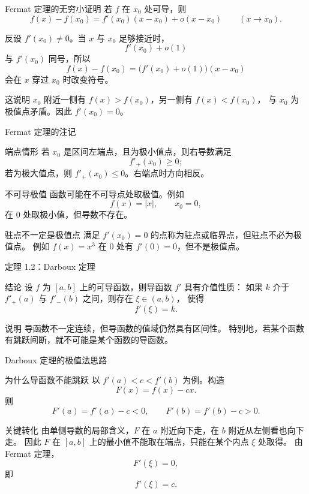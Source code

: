 \documentclass[aspectratio=169,10pt]{ctexbeamer}
\begin{document}
\begin{frame}{Fermat 定理的无穷小证明}
\small
若 $f$ 在 $x_0$ 处可导，则
\[
  f(x)-f(x_0)=f'(x_0)(x-x_0)+o(x-x_0)\qquad (x\to x_0).
\]

反设 $f'(x_0)\ne0$。当 $x$ 与 $x_0$ 足够接近时，
\[
  f'(x_0)+o(1)
\]
与 $f'(x_0)$ 同号，所以
\[
  f(x)-f(x_0)=\bigl(f'(x_0)+o(1)\bigr)(x-x_0)
\]
会在 $x$ 穿过 $x_0$ 时改变符号。

这说明 $x_0$ 附近一侧有 $f(x)>f(x_0)$，另一侧有 $f(x)<f(x_0)$，
与 $x_0$ 为极值点矛盾。因此 $f'(x_0)=0$。
\end{frame}

\begin{frame}{Fermat 定理的注记}
\footnotesize
\begin{block}{端点情形}
若 $x_0$ 是区间左端点，且为极小值点，则右导数满足
\[
  f'_+(x_0)\ge0;
\]
若为极大值点，则 $f'_+(x_0)\le0$。右端点时方向相反。
\end{block}
\begin{block}{不可导极值}
函数可能在不可导点处取极值。例如
\[
  f(x)=|x|,\qquad x_0=0,
\]
在 $0$ 处取极小值，但导数不存在。
\end{block}
\begin{alertblock}{驻点不一定是极值点}
满足 $f'(x_0)=0$ 的点称为驻点或临界点，但驻点不必为极值点。
例如 $f(x)=x^3$ 在 $0$ 处有 $f'(0)=0$，但不是极值点。
\end{alertblock}
\end{frame}

\begin{frame}{定理 1.2：Darboux 定理}
\small
\begin{block}{结论}
设 $f$ 为 $[a,b]$ 上的可导函数，则导函数 $f'$ 具有介值性质：
如果 $k$ 介于 $f'_+(a)$ 与 $f'_-(b)$ 之间，则存在 $\xi\in(a,b)$，
使得
\[
  f'(\xi)=k.
\]
\end{block}
\begin{block}{说明}
导函数不一定连续，但导函数的值域仍然具有区间性。
特别地，若某个函数有跳跃间断，就不可能是某个函数的导函数。
\end{block}
\end{frame}

\begin{frame}{Darboux 定理的极值法思路}
\small
\begin{block}{为什么导函数不能跳跃}
以 $f'(a)<c<f'(b)$ 为例。构造
\[
  F(x)=f(x)-cx.
\]
则
\[
  F'(a)=f'(a)-c<0,\qquad F'(b)=f'(b)-c>0.
\]
\end{block}

\begin{block}{关键转化}
由单侧导数的局部含义，$F$ 在 $a$ 附近向下走，在 $b$ 附近从左侧看也向下走。
因此 $F$ 在 $[a,b]$ 上的最小值不能取在端点，只能在某个内点 $\xi$ 处取得。
由 Fermat 定理，
\[
  F'(\xi)=0,
\]
即
\[
  f'(\xi)=c.
\]
\end{block}
\end{frame}
\end{document}
